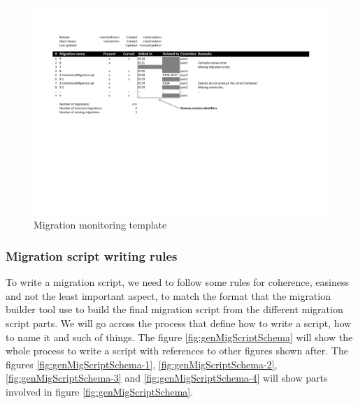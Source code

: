 \begin{figure}[h]
        \centering
        \includegraphics[scale=0.55]{images/MigrationMonitoringTemplate.pdf}
        \caption{Migration monitoring template}
        \label{fig:migTemplate}
\end{figure}

\subsubsection{Migration script writing rules\\}
	\label{sec:rules}

To write a migration script, we need to follow some rules for coherence, easiness and not the least important aspect, to match the format that the migration builder tool use to build the final migration script from the different migration script parts. We will go across the process that define how to write a script, how to name it and such of things. The figure \ref{fig:genMigScriptSchema} will show the whole process to write a script with references to other figures shown after. The figures \ref{fig:genMigScriptSchema-1}, \ref{fig:genMigScriptSchema-2}, \ref{fig:genMigScriptSchema-3} and \ref{fig:genMigScriptSchema-4} will show parts involved in figure \ref{fig:genMigScriptSchema}.

